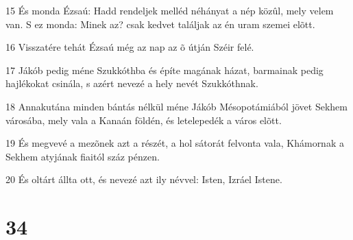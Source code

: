 \par 15 És monda Ézsaú: Hadd rendeljek melléd néhányat a nép közûl, mely velem van. S ez monda: Minek az? csak kedvet találjak az én uram szemei elõtt.
\par 16 Visszatére tehát Ézsaú még az nap az õ útján Széir felé.
\par 17 Jákób pedig méne Szukkóthba és építe magának házat, barmainak pedig hajlékokat csinála, s azért nevezé a hely nevét Szukkóthnak.
\par 18 Annakutána minden bántás nélkül méne Jákób Mésopotámiából jövet Sekhem városába, mely vala a Kanaán földén, és letelepedék a város elõtt.
\par 19 És megvevé a mezõnek azt a részét, a hol sátorát felvonta vala, Khámornak a Sekhem atyjának fiaitól száz pénzen.
\par 20 És oltárt állta ott, és nevezé azt ily névvel: Isten, Izráel Istene.

\chapter{34}

